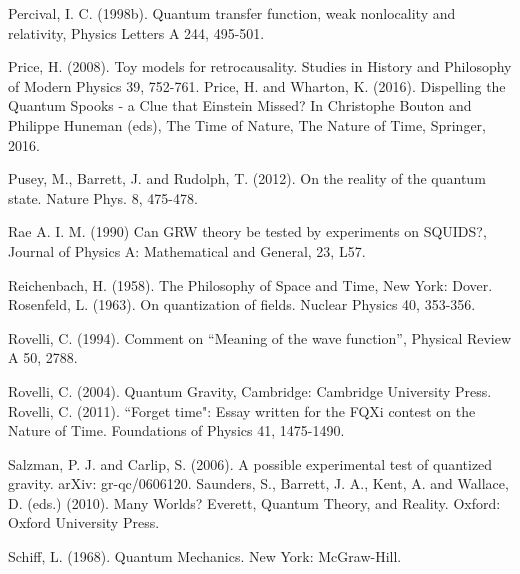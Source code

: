 \begin{thebibliography}{}
\bibitem{} Percival, I. C. (1998b).  Quantum transfer function, weak nonlocality and relativity, Physics Letters A 244, 495-501. 


\bibitem{} Price, H. (2008). Toy models for retrocausality. Studies in History and Philosophy of Modern Physics 39, 752-761.
\bibitem{} Price, H. and Wharton, K. (2016). Dispelling the Quantum Spooks - a Clue that Einstein Missed? In Christophe Bouton and Philippe Huneman (eds), The Time of Nature, The Nature of Time, Springer, 2016.


\bibitem{} Pusey, M., Barrett, J. and Rudolph, T. (2012). On the reality of the quantum state. Nature Phys. 8, 475-478.

\bibitem{} Rae A. I. M. (1990) Can GRW theory be tested by experiments on SQUIDS?, Journal of Physics A: Mathematical and General, 23, L57.

\bibitem{} Reichenbach, H. (1958). The Philosophy of Space and Time, New York: Dover. 
\bibitem{} Rosenfeld, L. (1963). On quantization of fields. Nuclear Physics 40, 353-356.

\bibitem{} Rovelli, C. (1994). Comment on ``Meaning of the wave function'', Physical Review A 50, 2788.

\bibitem{} Rovelli, C.  (2004). Quantum Gravity, Cambridge: Cambridge University Press.
\bibitem{} Rovelli, C.  (2011). ``Forget time": Essay written for the FQXi contest on the Nature of Time. Foundations of Physics 41, 1475-1490.

\bibitem{} Salzman, P. J. and Carlip, S. (2006). A possible experimental test of quantized gravity. arXiv: gr-qc/0606120.
\bibitem{} Saunders, S., Barrett, J. A., Kent, A. and Wallace, D. (eds.) (2010). Many Worlds? Everett, Quantum Theory, and Reality. Oxford: Oxford University Press.


\bibitem{} Schiff, L. (1968). Quantum Mechanics. New York: McGraw-Hill.


\end{thebibliography}
